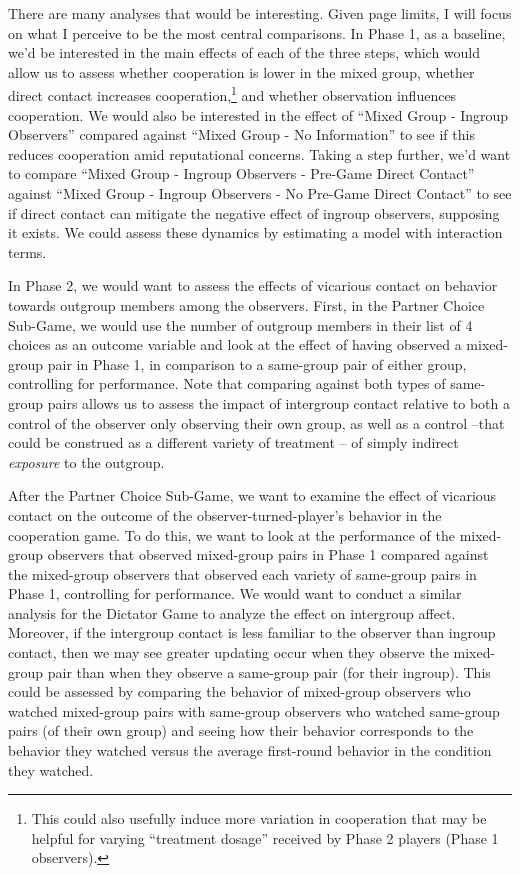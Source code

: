 \documentclass[10pt]{article}
\begin{document}
There are many analyses that would be interesting. Given page limits, I will 
focus on what I 
perceive to be the most central comparisons. In Phase 1, as a baseline, 
we'd be interested in the main effects of each of 
the three steps, which would allow us to 
assess whether cooperation is lower in the mixed group, 
whether direct contact increases cooperation,\footnote{This could also usefully induce 
more variation in cooperation that may be helpful for varying ``treatment dosage'' 
received by Phase 2 players (Phase 1 observers).} and whether 
observation influences cooperation. We would also be interested in the 
effect of ``Mixed Group - Ingroup Observers'' compared against ``Mixed Group - No 
Information'' to see if 
this reduces cooperation amid reputational concerns. Taking a step further, 
we'd want to compare ``Mixed Group - Ingroup Observers - Pre-Game Direct Contact''
against ``Mixed Group - Ingroup Observers - No Pre-Game Direct Contact'' to see if
direct contact can mitigate the negative effect of ingroup observers, supposing it exists.
We could assess these dynamics by estimating a model with interaction terms.


In Phase 2, we would want to assess the effects of vicarious contact on behavior 
towards outgroup members among the 
observers. First, in the Partner Choice Sub-Game, we would use 
the number of outgroup members in their list of 4 choices as an outcome variable 
and look at the effect of having observed a mixed-group pair in Phase 1, in comparison
to a same-group pair of either group, controlling for performance. Note that comparing against both types of 
same-group pairs allows us to assess the impact of intergroup contact 
relative to both a control of the observer only observing their own group, as well 
as a control --that could be construed as a different variety of treatment -- 
of simply indirect \emph{exposure} to the outgroup.

After the Partner Choice Sub-Game, we want to examine the effect of 
vicarious contact on the outcome of the observer-turned-player's behavior 
in the 
cooperation game. To do this, we want to look at the performance of the 
mixed-group
observers that observed mixed-group pairs in Phase 1 compared against the 
mixed-group observers that observed each variety of same-group pairs
in Phase 1, controlling for 
performance. We would want to conduct a similar analysis for the Dictator Game
to analyze the effect on intergroup affect.
Moreover, if the intergroup contact 
is less familiar to the observer than ingroup contact, then 
we may see greater updating occur when they observe the mixed-group pair
than when they observe a same-group pair (for their ingroup). This could be 
assessed by comparing the behavior of mixed-group observers who watched 
mixed-group pairs with same-group observers who watched same-group pairs 
(of their own group)
and seeing how their behavior corresponds to the behavior they watched 
versus the average first-round behavior in the condition they watched. 
\end{document}
